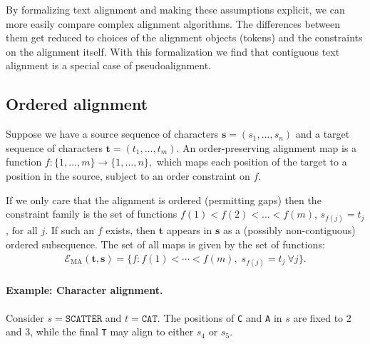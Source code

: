 By formalizing text alignment and making these assumptions explicit, we can more easily compare complex alignment algorithms. The differences between them get reduced to choices of the alignment objects (tokens) and the constraints on the alignment itself. With this formalization we find that contiguous text alignment is a special case of pseudoalignment.

\subsection{Ordered alignment}
Suppose we have a source sequence of characters  $\mathbf{s} = (s_1,\dots,s_n)$ and a target sequence of characters $\mathbf{t} = (t_1,\dots,t_m)$. An order-preserving alignment map is a function $f : \{1,\dots,m\} \to \{1,\dots,n\},$ which maps each position of the target to a position in the source, subject to an order constraint on $f$.

If we only care that the alignment is ordered (permitting gaps) then the constraint family is the set of functions $f(1) < f(2) < \dots < f(m)$, $s_{f(j)} = t_j$, $ \text{for all } j.$ If such an $f$ exists, then $\mathbf{t}$ appears in $\mathbf{s}$ as a (possibly non-contiguous) ordered subsequence.
The set of all maps is given by the set of functions:
\begin{align}
\mathcal{E}_{\mathrm{MA}}(\mathbf{t},\mathbf{s}) = \big\{ f : f(1)<\cdots<f(m),\; s_{f(j)} = t_j\ \forall j \big\}.
\end{align}


\paragraph{Example: Character alignment.}
Consider $s=\texttt{SCATTER}$ and $t=\texttt{CAT}$. The positions of \texttt{C} and \texttt{A} in $s$ are fixed to $2$ and $3$, while the final \texttt{T} may align to either $s_4$ or $s_5$.

